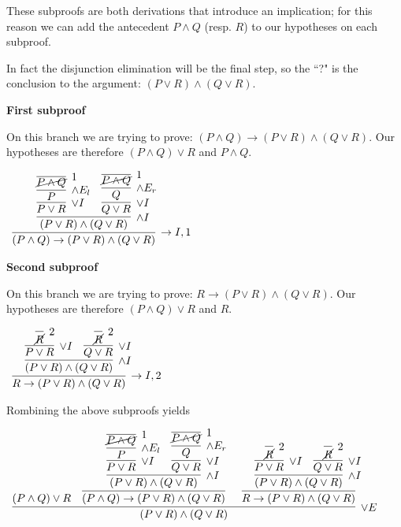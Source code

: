 \documentclass[11pt]{report}
\begin{document}
\begin{enumerate}
	These subproofs are both derivations that introduce an implication; for this reason we can add the antecedent $P \land Q$ (resp. $R$) to our hypotheses on each subproof. 

	In fact the disjunction elimination will be the final step, so the ``?" is the conclusion to the argument: $(P \lor R) \land (Q \lor R)$.

	\hspace{0.5cm} {\bf First subproof}

	On this branch we are trying to prove: $(P \land Q) \to (P \lor R) \land (Q \lor R)$. Our hypotheses are therefore $(P\land Q) \lor R$ and $P \land Q$.

	\begin{center}
		$\begin{array}{c}
			\infer[\to I,1]{(P \land Q) \to (P \lor R) \land (Q \lor R)}
				{\infer[\land I]{(P \lor R) \land (Q \lor R)}
					{\infer[\lor I]{P \lor R}
						{\infer[\land E_{l}]{P}
							{\infer[1]{\cancel{P \land Q}}{}}}
					&
					\infer[\lor I]{Q \lor R}
						{\infer[\land E_{r}]{Q}
							{\infer[1]{\cancel{P \land Q}}{}}}}}
		\end{array}$
	\end{center}

	\hspace{0.5cm} {\bf Second subproof}

	On this branch we are trying to prove: $R \to (P \lor R) \land (Q \lor R)$. Our hypotheses are therefore $(P\land Q) \lor R$ and $R$.
	
	\begin{center}
		$\begin{array}{c}
			\infer[\to I,2]{R \to (P \lor R) \land (Q \lor R)}
				{\infer[\land I]{(P \lor R) \land (Q \lor R)}
					{\infer[\lor I]{P \lor R}
						{\infer[2]{\cancel{R}}{}}
					&
					\infer[\lor I]{Q \lor R}
						{\infer[2]{\cancel{R}}{}}}}
		\end{array}$
	\end{center}

	Rombining the above subproofs yields
	\begin{mdframed}
		\begin{center}
			$\begin{array}{c}
				\infer[\lor E]{(P \lor R) \land (Q \lor R)}{(P \land Q) \lor R
								&
								\infer[]{(P \land Q) \to (P \lor R) \land (Q \lor R)}
								{\infer[\land I]{(P \lor R) \land (Q \lor R)}
									{\infer[\lor I]{P \lor R}
										{\infer[\land E_{l}]{P}
											{\infer[1]{\cancel{P \land Q}}{}}}
									&
									\infer[\lor I]{Q \lor R}
										{\infer[\land E_{r}]{Q}
											{\infer[1]{\cancel{P \land Q}}{}}}}}
								&
								\infer[]{R \to (P \lor R) \land (Q \lor R)}
								{\infer[\land I]{(P \lor R) \land (Q \lor R)}
									{\infer[\lor I]{P \lor R}
										{\infer[2]{\cancel{R}}{}}
									&
									\infer[\lor I]{Q \lor R}
										{\infer[2]{\cancel{R}}{}}}}}
			\end{array}$
		\end{center}
	\end{mdframed}

\end{enumerate}
\end{document}
